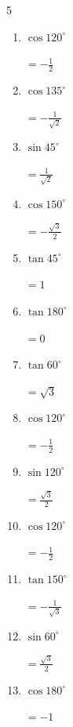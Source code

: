 \begin{multicols}{5}
\begin{enumerate}
\columnbreak %

  \item $\displaystyle \cos{120^\circ}$

        $\displaystyle =-\frac{1}{2}$

  \item $\displaystyle \cos{135^\circ}$

        $\displaystyle =-\frac{1}{\sqrt{2}}$

  \item $\displaystyle \sin{45^\circ}$

        $\displaystyle =\frac{1}{\sqrt{2}}$

  \item $\displaystyle \cos{150^\circ}$

        $\displaystyle =-\frac{\sqrt{3}}{2}$

  \item $\displaystyle \tan{45^\circ}$

        $\displaystyle =1$

  \item $\displaystyle \tan{180^\circ}$

        $\displaystyle =0$

  \item $\displaystyle \tan{60^\circ}$

        $\displaystyle =\sqrt{3}$

  \item $\displaystyle \cos{120^\circ}$

        $\displaystyle =-\frac{1}{2}$

  \item $\displaystyle \sin{120^\circ}$

        $\displaystyle =\frac{\sqrt{3}}{2}$

  \item $\displaystyle \cos{120^\circ}$

        $\displaystyle =-\frac{1}{2}$

  \item $\displaystyle \tan{150^\circ}$

        $\displaystyle =-\frac{1}{\sqrt{3}}$

  \item $\displaystyle \sin{60^\circ}$

        $\displaystyle =\frac{\sqrt{3}}{2}$

  \item $\displaystyle \cos{180^\circ}$

        $\displaystyle =-1$


\end{enumerate}
\end{multicols}
